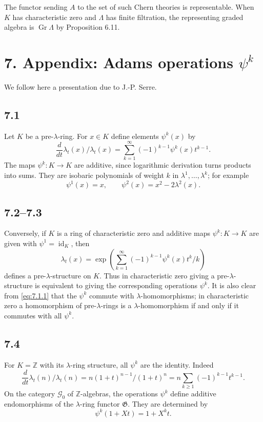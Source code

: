 \documentclass[13pt]{extarticle}
\newcommand{\ZZ}{\mathbb Z}
\newcommand{\Go}{\mathfrak G}
\newcommand{\Gr}{\operatorname{Gr}}
\newcommand{\id}{\operatorname{id}}
\begin{document}
The functor sending $A$ to the set of such Chern theories is representable. When $K$ has characteristic zero and $\Lambda$ has finite filtration, the representing graded algebra is $\Gr\Lambda$ by Proposition 6.11.

\section*{7. Appendix: Adams operations $\psi^k$}

We follow here a presentation due to J.-P. Serre.

\subsection*{7.1}
Let $K$ be a pre-$\lambda$-ring. For $x\in K$ define elements $\psi^k(x)$ by
\begin{equation}\label{eq:7.1.1}
\frac{d}{dt}\lambda_t(x)\big/\lambda_t(x)=\sum_{k=1}^{\infty}(-1)^{k-1}\psi^k(x)t^{k-1}.
\end{equation}
The maps $\psi^k:K\to K$ are additive, since logarithmic derivation turns products into sums. They are isobaric polynomials of weight $k$ in $\lambda^1,\ldots,\lambda^k$; for example
\[
\psi^1(x)=x,
\qquad
\psi^2(x)=x^2-2\lambda^2(x).
\]

\subsection*{7.2--7.3}
Conversely, if $K$ is a ring of characteristic zero and additive maps $\psi^k:K\to K$ are given with $\psi^1=\id_K$, then
\begin{equation}\label{eq:7.2.1}
\lambda_t(x)=\exp\left(\sum_{k=1}^{\infty}(-1)^{k-1}\psi^k(x)t^k/k\right)
\end{equation}
defines a pre-$\lambda$-structure on $K$. Thus in characteristic zero giving a pre-$\lambda$-structure is equivalent to giving the corresponding operations $\psi^k$. It is also clear from \eqref{eq:7.1.1} that the $\psi^k$ commute with $\lambda$-homomorphisms; in characteristic zero a homomorphism of pre-$\lambda$-rings is a $\lambda$-homomorphism if and only if it commutes with all $\psi^k$.

\subsection*{7.4}
For $K=\ZZ$ with its $\lambda$-ring structure, all $\psi^k$ are the identity. Indeed
\[
\frac{d}{dt}\lambda_t(n)\big/\lambda_t(n)=n(1+t)^{n-1}/(1+t)^n=n\sum_{k\geq 1}(-1)^{k-1}t^{k-1}.
\]
On the category $\mathcal G_0$ of $\ZZ$-algebras, the operations $\psi^k$ define additive endomorphisms of the $\lambda$-ring functor $\Go$. They are determined by
\begin{equation}\label{eq:7.4.1}
\psi^k(1+Xt)=1+X^kt.
\end{equation}
\end{document}
